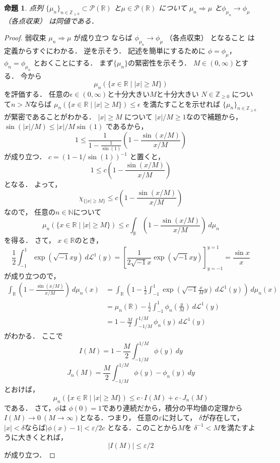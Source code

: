 \documentclass[leqno, 12pt]{jsarticle}
\newtheorem{prop}[thm]{命題}
\newcommand{\To}{\Longrightarrow}
\newcommand{\nn}{\mathbb{N}}
\newcommand{\zz}{\mathbb{Z}}
\newcommand{\rr}{\mathbb{R}}
\newcommand{\ep}{\varepsilon}
\begin{document}
\begin{prop}
点列
$\{\mu_n\}_{n\in \zz_{\ge 0}}\subset \mathcal{P}(\rr)$
と$\mu\in \mathcal{P}(\rr)$
について
$\mu_n\To \mu$
と$\phi_{\mu_n}\to \phi_{\mu}$ （各点収束）
は同値である．
\end{prop}
\begin{proof}
弱収束
$\mu_n\To \mu$
が成り立つ
ならば
$\phi_{\mu_n}\to \phi_{\mu}$ （各点収束）
となること
は定義からすぐにわかる．
逆を示そう．
記述を簡単にするために
$\phi=\phi_{\mu}$，
$\phi_{n}=\phi_{\mu_{n}}$
とおくことにする．
まず$\{\mu_n\}$の緊密性を示そう．
$M\in (0, \infty)$とする．
今から
\[
\mu_n(\{x\in \rr\mid |x|\ge M\})
\]
を評価する．
任意の$\epsilon\in (0, \infty)と$十分大きい$M$と十分大きい
$N\in \zz_{\ge 0}$
について$n>N$ならば
$\mu_n(\{x\in \rr\mid |x|\ge M\})\le \epsilon$
を満たすことを示せれば
$\{\mu_{n}\}_{n\in \zz_{\ge 0}}$
が緊密であることがわかる．
$|x|\ge M$
について
$|x|/M\ge 1$なので補題から，
$\sin(|x|/M)\le |x|/M\sin (1)$
であるから，
\[
1\le \frac{1}{1-\frac{1}{\sin (1)}}\left(1-\frac{\sin(x/M)}{x/M}\right)
\]
が成り立つ．
$c=(1-1/\sin (1))^{-1}$
と置くと，
\[
1\le c\left(1-\frac{\sin(x/M)}{x/M}\right)
\]
となる．
よって，
\[
\chi_{\{|x|\ge M\}}\le c\left(1-\frac{\sin(x/M)}{x/M}\right)
\]
なので，
任意の$n\in \nn$について
\[
	\mu_n(\{x\in \rr\mid |x|\ge M\})
	\le
	 c\int_{\rr}\left(1-\frac{\sin(x/M)}{x/M}\right)\ d\mu_n
\]
を得る．
さて，
$x\in \rr$のとき，
\[
	\frac{1}{2}\int_{-1}^{1}\exp(\sqrt{-1}xy)\ d\mathcal{L}^{1}(y)=
	\left[
	\frac{1}{2\sqrt{-1}x}\exp(\sqrt{-1}xy)
	\right]_{y=-1}^{y=1}
	=
	\frac{\sin x}{x}
\]
が成り立つので，
\begin{align*}
	\int_{\rr}\left(1-\frac{\sin(x/M)}{x/M}\right)\ d\mu_n(x)
	&=
	\int_{\rr}
	\left(1-\frac{1}{2}\int_{-1}^{1}\exp\left(\sqrt{-1}\frac{x}{M}y\right)\ 
	d\mathcal{L}^{1}(y)\right)\ d\mu_n(x)
	\\
	&=
	\mu_{n}(\rr)-\frac{1}{2}\int_{-1}^{1}\phi_n\left(\frac{y}{M}\right)\ d\mathcal{L}^{1}(y) 
	\\
	&=
	1-\frac{M}{2}
	\int_{-1/M}^{1/M}\phi_n\left(y\right)\ d\mathcal{L}^{1}(y) 
\end{align*}
がわかる．
ここで
\[
I(M)=1-\frac{M}{2}\int_{-1/M}^{1/M}\phi\left(y\right)\ dy 
\]
\[
J_n(M)=\frac{M}{2}\int_{-1/M}^{1/M}\phi(y)-\phi_n\left(y\right)\ dy 
\]
とおけば，
\[
\mu_n(\{x\in \rr\mid |x|\ge M\})\le 
c\cdot I(M)+c\cdot J_n(M)
\]
である．
さて，$\phi$は
$\phi(0)=1$であり連続だから，積分の平均値の定理から
$I(M)\to 0\ (M\to \infty)$となる．つまり，
任意の$\ep$に対して，
$\delta$が存在して，
$|x|<\delta$ならば$|\phi(x)-1|<\ep/2c$
となる．このことから$M$を
$\delta^{-1}<M$を満たすように大きくとれば，
\[
|I(M)|\le \ep/2
\]
が成り立つ．


\end{proof}
\end{document}
